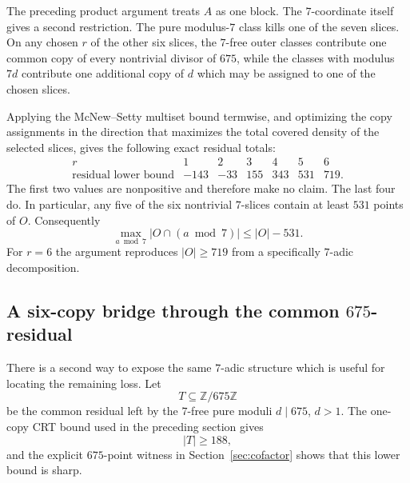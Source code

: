 \documentclass[11pt]{article}
\theoremstyle{definition}
\newcommand{\Z}{\mathbb Z}
\begin{document}
The preceding product argument treats $A$ as one block.  The $7$-coordinate itself gives a
second restriction.  The pure modulus-$7$ class kills one of the seven slices.  On any chosen
$r$ of the other six slices, the $7$-free outer classes contribute one common copy of every
nontrivial divisor of $675$, while the classes with modulus $7d$ contribute one additional copy
of $d$ which may be assigned to one of the chosen slices.

Applying the McNew--Setty multiset bound termwise, and optimizing the copy assignments in the
direction that maximizes the total covered density of the selected slices, gives the following
exact residual totals:
\[
\begin{array}{c|rrrrrr}
 r&1&2&3&4&5&6\\
\hline
 \text{residual lower bound}&-143&-33&155&343&531&719.
\end{array}
\]
The first two values are nonpositive and therefore make no claim.  The last four do.  In
particular, any five of the six nontrivial $7$-slices contain at least $531$ points of $O$.
Consequently
\begin{equation}\label{eq:seven-concentration}
 \boxed{
 \max_{a\bmod7}|O\cap(a\bmod7)|\le |O|-531.}
\end{equation}
For $r=6$ the argument reproduces $|O|\ge719$ from a specifically $7$-adic decomposition.

\subsection{A six-copy bridge through the common $675$-residual}

There is a second way to expose the same $7$-adic structure which is useful for locating the
remaining loss.  Let
\[
 T\subseteq\Z/675\Z
\]
be the common residual left by the $7$-free pure moduli $d\mid675$, $d>1$.  The one-copy CRT
bound used in the preceding section gives
\[
 |T|\ge188,
\]
and the explicit $675$-point witness in Section~\ref{sec:cofactor} shows that this lower
bound is sharp.
\end{document}
